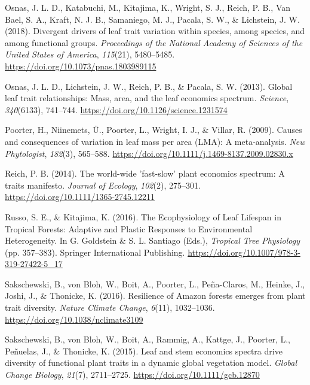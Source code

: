 \documentclass[
  12pt,
  a4paper,
,tablecaptionabove
]{scrartcl}
\newlength{\cslhangindent}
\newenvironment{CSLReferences}[2] %
 {%
  \setlength{\parindent}{0pt}
  \ifodd #1 \everypar{\setlength{\hangindent}{\cslhangindent}}\ignorespaces\fi
  \ifnum #2 > 0
  \setlength{\parskip}{#2\baselineskip}
  \fi
 }%
 {}
\begin{document}
\begin{CSLReferences}{1}{0}
\leavevmode{}%
Osnas, J. L. D., Katabuchi, M., Kitajima, K., Wright, S. J., Reich, P.
B., Van Bael, S. A., Kraft, N. J. B., Samaniego, M. J., Pacala, S. W.,
\& Lichstein, J. W. (2018). Divergent drivers of leaf trait variation
within species, among species, and among functional groups.
\emph{Proceedings of the National Academy of Sciences of the United
States of America}, \emph{115}(21), 5480--5485.
\url{https://doi.org/10.1073/pnas.1803989115}

\leavevmode{}%
Osnas, J. L. D., Lichstein, J. W., Reich, P. B., \& Pacala, S. W.
(2013). Global leaf trait relationships: {Mass}, area, and the leaf
economics spectrum. \emph{Science}, \emph{340}(6133), 741--744.
\url{https://doi.org/10.1126/science.1231574}

\leavevmode{}%
Poorter, H., Niinemets, Ü., Poorter, L., Wright, I. J., \& Villar, R.
(2009). Causes and consequences of variation in leaf mass per area
({LMA}): {A} meta-analysis. \emph{New Phytologist}, \emph{182}(3),
565--588. \url{https://doi.org/10.1111/j.1469-8137.2009.02830.x}

\leavevmode{}%
Reich, P. B. (2014). The world-wide 'fast-slow' plant economics
spectrum: {A} traits manifesto. \emph{Journal of Ecology},
\emph{102}(2), 275--301. \url{https://doi.org/10.1111/1365-2745.12211}

\leavevmode{}%
Russo, S. E., \& Kitajima, K. (2016). The {Ecophysiology} of {Leaf
Lifespan} in {Tropical Forests}: {Adaptive} and {Plastic Responses} to
{Environmental Heterogeneity}. In G. Goldstein \& S. L. Santiago (Eds.),
\emph{Tropical {Tree Physiology}} (pp. 357--383). {Springer
International Publishing}.
\url{https://doi.org/10.1007/978-3-319-27422-5_17}

\leavevmode{}%
Sakschewski, B., von Bloh, W., Boit, A., Poorter, L., Peña-Claros, M.,
Heinke, J., Joshi, J., \& Thonicke, K. (2016). Resilience of {Amazon}
forests emerges from plant trait diversity. \emph{Nature Climate
Change}, \emph{6}(11), 1032--1036.
\url{https://doi.org/10.1038/nclimate3109}

\leavevmode{}%
Sakschewski, B., von Bloh, W., Boit, A., Rammig, A., Kattge, J.,
Poorter, L., Peñuelas, J., \& Thonicke, K. (2015). Leaf and stem
economics spectra drive diversity of functional plant traits in a
dynamic global vegetation model. \emph{Global Change Biology},
\emph{21}(7), 2711--2725. \url{https://doi.org/10.1111/gcb.12870}


\end{CSLReferences}
\end{document}
